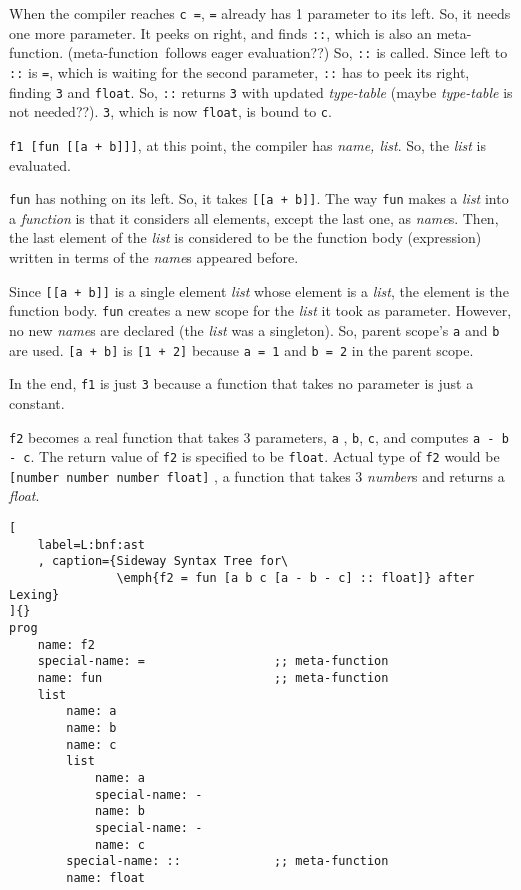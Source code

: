 \documentclass[12pt,letterpaper,notitlepage]{article}
\newcommand{\op}{meta-function}
\begin{document}
When the compiler reaches \verb!c =!, \verb!=! already has 1 parameter
to its left. So, it needs one more parameter.
It peeks on right, and finds \verb!::!, which is also an \op .
(\op\ follows eager evaluation??)
So, \verb!::! is called. Since left to \verb!::! is \verb!=!, which is
waiting for the second parameter, \verb!::! has to peek its right, finding
\verb!3! and \verb!float!. So, \verb!::! returns \verb!3!
with updated \emph{type-table} (maybe \emph{type-table} is not needed??).
\verb!3!, which is now \verb!float!, is bound to \verb!c!.

\verb!f1 [fun [[a + b]]]!, at this point, the compiler has
\emph{name, list}. So, the \emph{list} is evaluated.

\verb!fun! has nothing on its left. So, it takes \verb![[a + b]]!.
The way \verb!fun! makes a \emph{list} into a \emph{function} is that
it considers all elements, except the last one, as \emph{name}s.
Then, the last element of the \emph{list} is considered to be
the function body (expression) written in terms of the \emph{name}s
appeared before.

Since \verb![[a + b]]! is a single element \emph{list} whose
element is a \emph{list}, the element is the function body.
\verb!fun! creates a new scope for the \emph{list} it took as parameter.
However, no new \emph{name}s are declared (the \emph{list} was a singleton).
So, parent scope's \verb!a! and \verb!b! are used.
\verb![a + b]! is \verb![1 + 2]! because \verb!a = 1! and \verb!b = 2!
in the parent scope.

In the end, \verb!f1! is just \verb!3! because a function that takes
no parameter is just a constant.

\verb!f2! becomes a real function that takes 3 parameters, \verb!a!
, \verb!b!, \verb!c!,  and computes \verb!a - b - c!.
The return value of \verb!f2! is specified to be \verb!float!.
Actual type of \verb!f2! would be \verb![number number number float]!
, a function that takes 3 \emph{number}s and returns a \emph{float}.

\begin{lstlisting}[
    label=L:bnf:ast
    , caption={Sideway Syntax Tree for\
               \emph{f2 = fun [a b c [a - b - c] :: float]} after Lexing}
]{}
prog
    name: f2
    special-name: =                  ;; meta-function
    name: fun                        ;; meta-function
    list
        name: a
        name: b
        name: c
        list
            name: a
            special-name: -
            name: b
            special-name: -
            name: c
        special-name: ::             ;; meta-function
        name: float
\end{lstlisting}
\end{document}
